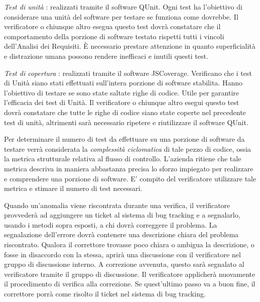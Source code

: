 \begin{elenconumerato}[\textbf{}]{\subsubsecindent}
\item \textit{Test di unit\`a}
: realizzati tramite il software QUnit. Ogni test ha l'obiettivo di considerare una unit\`a del software per testare se  funziona come dovrebbe. Il verificatore o chiunque altro esegua questo test dovr\`a constatare che il comportamento della porzione di software testato rispetti tutti i vincoli dell'Analisi dei Requisiti. \`E necessario prestare attenzione in quanto superficialit\`a e distrazione umana possono rendere inefficaci e inutili questi test.
\item \textit{Test di copertura}
: realizzati tramite il software JSCoverage. Verificano che i test di Unit\`a siano stati effettuati sull'intera porzione di software stabilita. Hanno l'obiettivo di testare se sono state saltate righe di codice. Utile per garantire l'efficacia dei test di Unit\`a. 
Il verificatore o chiunque altro esegui questo test dovr\`a constatare che tutte le righe di codice siano state coperte nel precedente test di unit\`a, altrimenti sar\`a necessario ripetere e riutilizzare il software QUnit.

\end{elenconumerato}

Per determinare il numero di test da effettuare su una porzione di software da testare verr\`a considerata la \textit{complessit\`a ciclomatica} di tale pezzo di codice, ossia la metrica strutturale relativa al flusso di controllo. L'azienda ritiene che tale metrica descriva in maniera abbastanza precisa lo sforzo impiegato per realizzare e comprendere una porzione di software. E' compito del verificatore utilizzare tale metrica e stimare il numero di test necessari.


 
 
Quando un'anomalia viene riscontrata durante una verifica, il verificatore provveder\`a ad aggiungere un ticket al sistema di bug tracking e a segnalarlo, usando i metodi sopra esposti, a chi dovr\`a correggere il problema. La segnalazione dell'errore dovr\`a contenere una descrizione chiara del problema riscontrato. Qualora il correttore trovasse poco chiara o ambigua la descrizione, o fosse in disaccordo con la stessa, aprir\`a una discussione con il verificatore nel gruppo di discussione interno. A correzione avvenuta, questo sar\`a segnalato al verificatore tramite il gruppo di discussione. Il verificatore applicher\`a nuovamente il procedimento di verifica alla correzione. Se quest'ultimo passo va a buon fine, il correttore porr\`a come risolto il ticket nel sistema di bug tracking.
 
